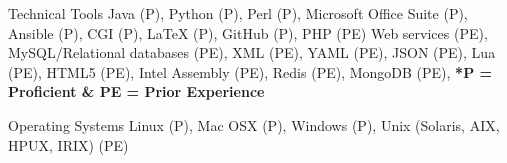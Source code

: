 


\begin{cvskills}


\cvskill
{Technical Tools} %
{Java (P), Python (P), Perl (P), Microsoft Office Suite (P), Ansible (P), CGI (P), LaTeX (P), GitHub (P), PHP (PE) Web services (PE), MySQL/Relational databases (PE), XML (PE), YAML (PE), JSON (PE), Lua (PE),  HTML5 (PE), Intel Assembly (PE),  Redis (PE), MongoDB (PE), \textbf{*P = Proficient \& PE = Prior Experience}} %





\cvskill
{Operating Systems} %
{Linux (P), Mac OSX (P), Windows (P), Unix (Solaris, AIX, HPUX, IRIX) (PE)} %




\end{cvskills}